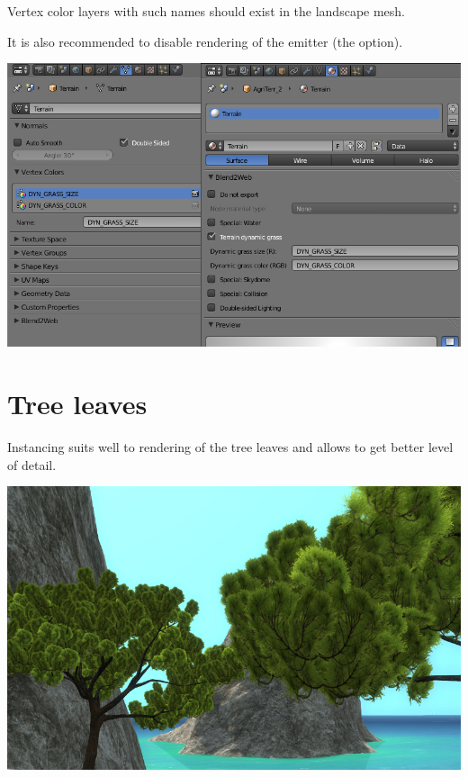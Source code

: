 \documentclass[a4paper,12pt,oneside]{sphinxmanual}
\begin{document}
Vertex color layers with such names should exist in the landscape mesh.

It is also recommended to disable rendering of the emitter (the  option).

{\hfill\includegraphics[width=1.000\linewidth]{dynamic_grass_setup.jpg}\hfill}


\section{Tree leaves}
\label{particles_instancing:particles-leaves}\label{particles_instancing:id4}
Instancing suits well to rendering of the tree leaves and allows to get better level of detail.

{\hfill\includegraphics[width=1.000\linewidth]{tree_leaves.jpg}\hfill}

\begin{DUlineblock}{0em}
\item[] 
\end{DUlineblock}
\end{document}
